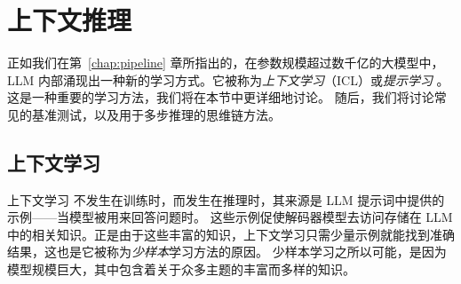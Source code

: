 \section{上下文推理}\label{sec:reasoning}
正如我们在第~\ref{chap:pipeline} 章所指出的，在参数规模超过数千亿的大模型中，LLM 内部涌现出一种新的学习方式。它被称为{\em 上下文学习}（ICL）或{\em 提示学习} \citep{brown2020language}。这是一种重要的学习方法，我们将在本节中更详细地讨论。
随后，我们将讨论常见的基准测试，以及用于多步推理的思维链方法。

\subsection{上下文学习}
上下文学习 \citep{dong2022survey} 不发生在训练时，而发生在推理时，其来源是 LLM 提示词中提供的示例——当模型被用来回答问题时。
这些示例促使解码器模型去访问存储在 LLM 中的相关知识。正是由于这些丰富的知识，上下文学习只需少量示例就能找到准确结果，这也是它被称为{\em 少样本}学习方法的原因。%
少样本学习之所以可能，是因为模型规模巨大，其中包含着关于众多主题的丰富而多样的知识。

